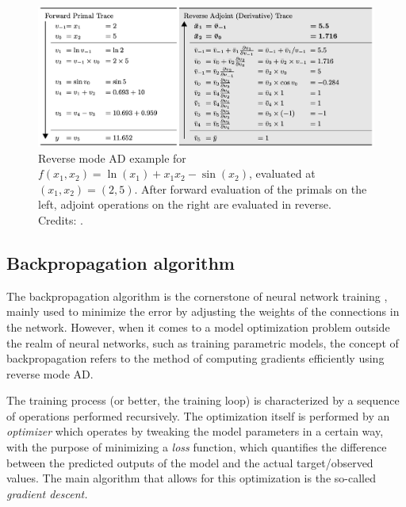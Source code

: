 \begin{figure}
    \centering
    \includegraphics[width=0.9\linewidth, keepaspectratio]{img//chapter4/reverse_trace.png}
    \caption[Reverse mode AD example]{Reverse mode AD example for $f(x_1, x_2) = \ln{(x_1)} + x_1 x_2 - \sin{(x_2)}$, evaluated at $(x_1, x_2) = (2, 5)$. After forward evaluation of the primals on the left, adjoint operations on the right are evaluated in reverse.\\\small{Credits: \cite{baydin_automatic_2018}.}}
    \label{fig:reverse_trace}
\end{figure}


\subsection{Backpropagation algorithm}
\label{subsec:backpropagation_algorithm}
The backpropagation algorithm is the cornerstone of neural network training \citep{rumelhart_learning_1986,montavon_efficient_2012}, mainly used to minimize the error by adjusting the weights of the connections in the network. However, when it comes to a model optimization problem outside the realm of neural networks, such as training parametric models, the concept of backpropagation refers to the method of computing gradients efficiently using reverse mode AD.

The training process (or better, the training loop) is characterized by a sequence of operations performed recursively. The optimization itself is performed by an \emph{optimizer} which operates by tweaking the model parameters in a certain way, with the purpose of minimizing a \emph{loss} function, which quantifies the difference between the predicted outputs of the model and the actual target/observed values. 
The main algorithm that allows for this optimization is the so-called \emph{gradient descent.}


